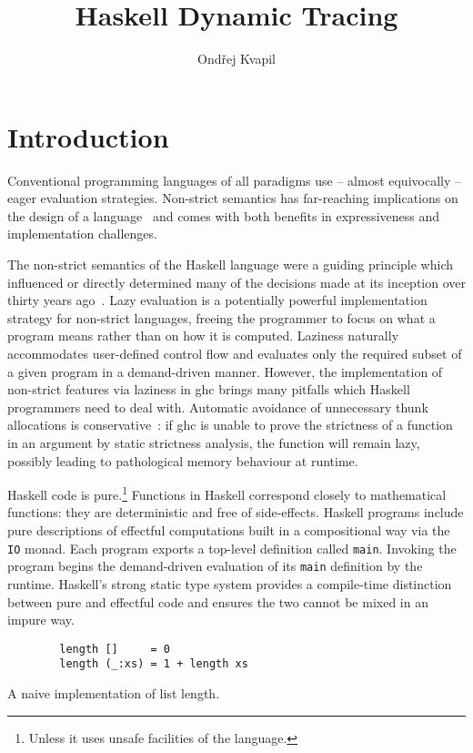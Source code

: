 \documentclass[thesis=B,english]{FITthesis}[2019/12/23]
\title{Haskell Dynamic Tracing}
\author{Ondřej Kvapil} %
\newcommand{\hsType}[1]{\texttt{#1}}
\newcommand{\hsIdent}[1]{\texttt{#1}}
\begin{document}
\chapter{Introduction} \label{sec:intro}
Conventional programming languages of all paradigms use -- almost equivocally
-- eager evaluation strategies. Non-strict semantics has far-reaching
implications on the design of a language~\cite{haskell-is-pure} and comes with
both benefits in expressiveness and implementation challenges.

The non-strict semantics of the Haskell language were a guiding principle which
influenced or directly determined many of the decisions made at its inception
over thirty years ago~\cite{history-of-haskell}. Lazy evaluation is a
potentially powerful implementation strategy for non-strict languages, freeing
the programmer to focus on what a program means rather than on how it is
computed. Laziness naturally accommodates user-defined control flow and
evaluates only the required subset of a given program in a demand-driven
manner. However, the implementation of non-strict features via laziness in
\acrshort{ghc} brings many pitfalls which Haskell programmers need to deal
with. Automatic avoidance of unnecessary thunk allocations is
conservative~\cite{cmtary-demand-analysis}: if \acrshort{ghc} is unable to
prove the strictness of a function in an argument by static strictness
analysis, the function will remain lazy, possibly leading to pathological
memory behaviour at runtime.

Haskell code is pure.\footnote{
	Unless it uses unsafe facilities of the language.
} Functions in Haskell correspond closely to mathematical functions: they are
deterministic and free of side-effects. Haskell programs include pure
descriptions of effectful computations built in a compositional way via the
\hsType{IO} monad. Each program exports a top-level definition called
\hsIdent{main}. Invoking the program begins the demand-driven evaluation of its
\hsIdent{main} definition by the runtime. Haskell's strong static type system
provides a compile-time distinction between pure and effectful code and ensures
the two cannot be mixed in an impure way.

\begin{listing}[h]
	\centering
	\begin{verbatim}
		length []     = 0
		length (_:xs) = 1 + length xs
	\end{verbatim}
	\caption{A naive implementation of list length.}
	\label{lst:length}
\end{listing}
\end{document}
